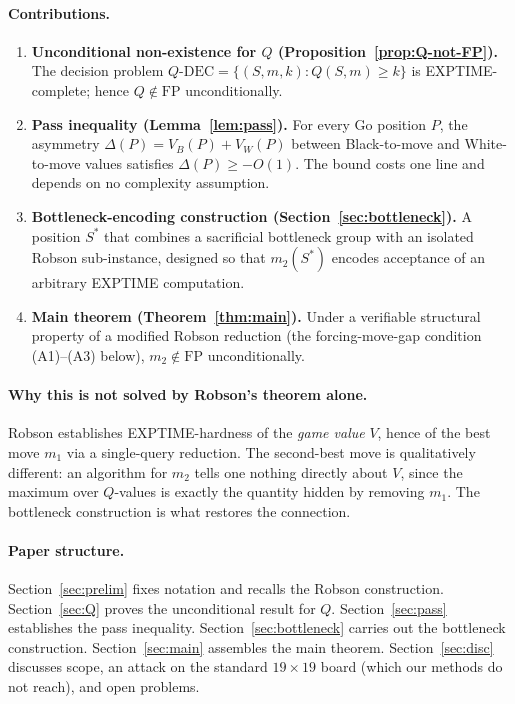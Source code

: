 \documentclass[11pt,a4paper]{amsart}
\theoremstyle{plain}
\theoremstyle{definition}
\theoremstyle{remark}
\newcommand{\FP}{\mathrm{FP}}
\begin{document}
\paragraph{Contributions.}
\begin{enumerate}[label=(C\arabic*),leftmargin=2.5em]
  \item \textbf{Unconditional non-existence for $Q$
    (Proposition~\ref{prop:Q-not-FP}).}
    The decision problem $Q\text{-DEC} = \{(S,m,k) : Q(S,m) \geq k\}$
    is EXPTIME-complete; hence $Q \notin \FP$ unconditionally.
  \item \textbf{Pass inequality (Lemma~\ref{lem:pass}).}
    For every Go position $P$, the asymmetry
    $\Delta(P) = V_B(P) + V_W(P)$ between Black-to-move and
    White-to-move values satisfies $\Delta(P) \geq -O(1)$.
    The bound costs one line and depends on no complexity assumption.
  \item \textbf{Bottleneck-encoding construction
    (Section~\ref{sec:bottleneck}).}
    A position $S^*$ that combines a sacrificial bottleneck group with
    an isolated Robson sub-instance, designed so that $m_2(S^*)$
    encodes acceptance of an arbitrary EXPTIME computation.
  \item \textbf{Main theorem (Theorem~\ref{thm:main}).}
    Under a verifiable structural property of a modified Robson
    reduction (the forcing-move-gap condition (A1)--(A3) below),
    $m_2 \notin \FP$ unconditionally.
\end{enumerate}

\paragraph{Why this is not solved by Robson's theorem alone.}
Robson establishes EXPTIME-hardness of the \emph{game value} $V$, hence
of the best move $m_1$ via a single-query reduction. The second-best
move is qualitatively different: an algorithm for $m_2$ tells one
nothing directly about $V$, since the maximum over $Q$-values is
exactly the quantity hidden by removing $m_1$. The bottleneck
construction is what restores the connection.

\paragraph{Paper structure.}
Section~\ref{sec:prelim} fixes notation and recalls the Robson
construction. Section~\ref{sec:Q} proves the unconditional result for
$Q$. Section~\ref{sec:pass} establishes the pass inequality.
Section~\ref{sec:bottleneck} carries out the bottleneck construction.
Section~\ref{sec:main} assembles the main theorem.
Section~\ref{sec:disc} discusses scope, an attack on the standard
$19 \times 19$ board (which our methods do not reach), and open problems.
\end{document}
